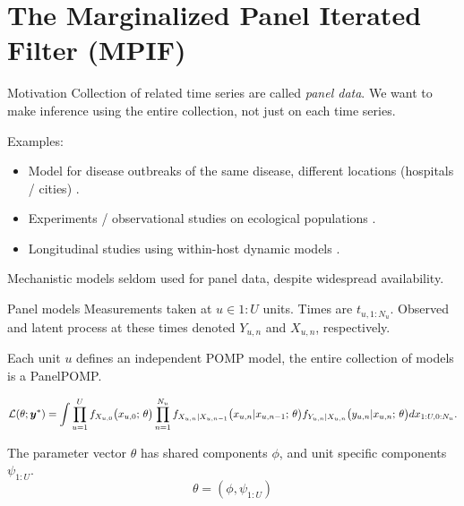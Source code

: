 \documentclass[aspectratio=169]{beamer}\usepackage[]{graphicx}\usepackage[]{xcolor}
\begin{document}
\section{The Marginalized Panel Iterated Filter (MPIF)}

\begin{frame}{Motivation}
Collection of related time series are called \emph{panel data}.
We want to make inference using the entire collection, not just on each time series.

Examples:
  \begin{itemize}
    \item Model for disease outbreaks of the same disease, different locations (hospitals / cities) \citep{lee20}.
    \item Experiments / observational studies on ecological populations \citep{searle16}.
    \item Longitudinal studies using within-host dynamic models \citep{ranjeva17}.
  \end{itemize}
  
  Mechanistic models seldom used for panel data, despite widespread availability.
  
\end{frame}

\begin{frame}{Panel models}
  Measurements taken at $u \in 1:U$ units. Times are $t_{u, 1:N_u}$. Observed and latent process at these times denoted $Y_{u, n}$ and $X_{u, n}$, respectively.
  
  Each unit $u$ defines an independent POMP model, the entire collection of models is a PanelPOMP.
  
  $$
  \mathcal{L}(\theta; \bm{y}^*) = \int \prod_{u = 1}^U f_{X_{u, 0}}\big(x_{u, 0};\, \theta\big)\prod_{n = 1}^{N_u} f_{X_{u, n}|X_{u, n-1}}\big(x_{u, n}|x_{u, n-1}; \, \theta\big)f_{Y_{u, n}|X_{u, n}}\big(y_{u, n}|x_{u, n}; \, \theta\big) dx_{1:U,0:N_u}.
  $$
  
  The parameter vector $\theta$ has shared components $\phi$, and unit specific components $\psi_{1:U}$.
  $$\theta = (\phi, \psi_{1:U})$$
  
\end{frame}
\end{document}
